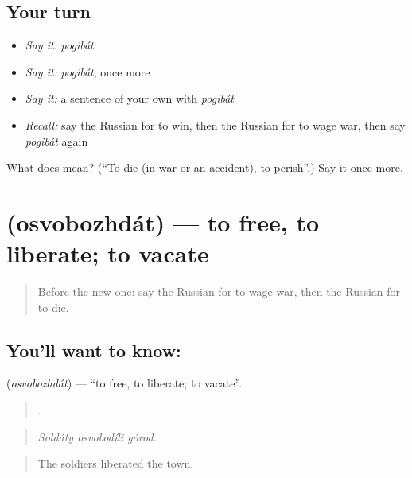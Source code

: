 \subsection*{Your turn}
\begin{itemize}
\raggedright
  \item \emph{Say it:} \emph{pogibát}
  \item \emph{Say it:} \emph{pogibát}, once more
  \item \emph{Say it:} a sentence of your own with \emph{pogibát}
  \item \emph{Recall:} say the Russian for to win, then the Russian for to wage war, then say \emph{pogibát} again
\end{itemize}

\begin{tcolorbox}[breakable,colback=teal!4,colframe=teal!35!black,title={Before you move on}]
What does  mean? (\textquotedblleft{}To die (in war or an accident), to perish\textquotedblright{}.) Say it once more.
\end{tcolorbox}
\section[\texorpdfstring{\ru{освобождать} (osvobozhdát)}{освобождать (osvobozhdát)}]{ (osvobozhdát) — to free, to liberate; to vacate}

\label{lesson:RU-C324-osvobozhdat}



\begin{quote}
Before the new one: say the Russian for to wage war, then the Russian for to die.
\end{quote}

\subsection*{You'll want to know: }
\textbf{} (\emph{osvobozhdát}) — \textquotedblleft{}to free, to liberate; to vacate\textquotedblright{}.

\begin{quote}
  .
\end{quote}

\begin{quote}
\emph{Soldáty osvobodíli górod.}
\end{quote}

\begin{quote}
The soldiers liberated the town.
\end{quote}

